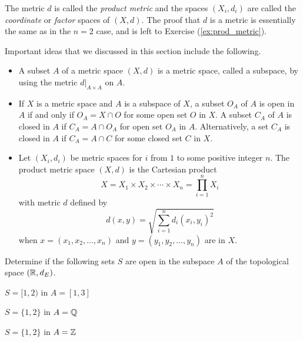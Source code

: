 The metric $d$ is called the \emph{product metric} and the spaces $(X_i,d_i)$ are called the \emph{coordinate} or \emph{factor} spaces of $(X,d)$. The proof that $d$ is a metric is essentially the same as in the $n=2$ case, and is left to Exercise (\ref{ex:prod_metric}). 

Important ideas that we discussed in this section include the following.
\begin{itemize}
\item A subset $A$ of a metric space $(X,d)$ is a metric space, called a subspace, by using the metric $d|_{A \times A}$ on $A$. 
\item If $X$ is a metric space and $A$ is a subspace of $X$, a subset $O_A$ of $A$ is open in $A$ if and only if $O_A = X \cap O$ for some open set $O$ in $X$. A subset $C_A$ of $A$ is closed in $A$ if $C_A = A \cap O_A$ for open set $O_A$ in $A$. Alternatively, a set $C_A$ is closed in $A$ if $C_A = A \cap C$ for some closed set $C$ in $X$.
\item Let $(X_i, d_i)$ be metric spaces for $i$ from $1$ to some positive integer $n$. The product metric space $(X,d)$ is the Cartesian product
\[X = X_1 \times X_2 \times \cdots \times X_n = \prod_{i=1}^n X_i\]
with metric $d$ defined by 
\[d(x,y) = \sqrt{\sum_{i=1}^n d_i(x_i,y_i)^2}\]
when $x = (x_1, x_2, \ldots, x_n)$ and $y = (y_1, y_2, \ldots, y_n)$ are in $X$.
\end{itemize}


\be

\item Determine if the following sets $S$ are open in the subspace $A$ of the topological space $(\mathbb{R}, d_E)$.

\ba

\item $S = [1,2)$ in $A = [1,3]$

\item $S = \{1, 2\}$ in $A = \mathbb{Q}$

\item $S = \{1,2\}$ in $A = \mathbb{Z}$

\ea

\begin{comment}

\ExerciseSolution

\ba

\item Since $S = A \cap (0,2)$, it follows that $S$ is open in $A$. 

\item Any open set in $\R$ that contains 1 also contains $B(1,r)$ for some $r > 0$. But this open ball contains points in $\Q$ that are not in $S$. We conclude that $S$ is not open in $A$. 

\item Since $S = \Z \cap (0,1.5) \cup (1.5,2.5)$, we conclude that $S$ is open in $A$.

\ea


\end{comment}

